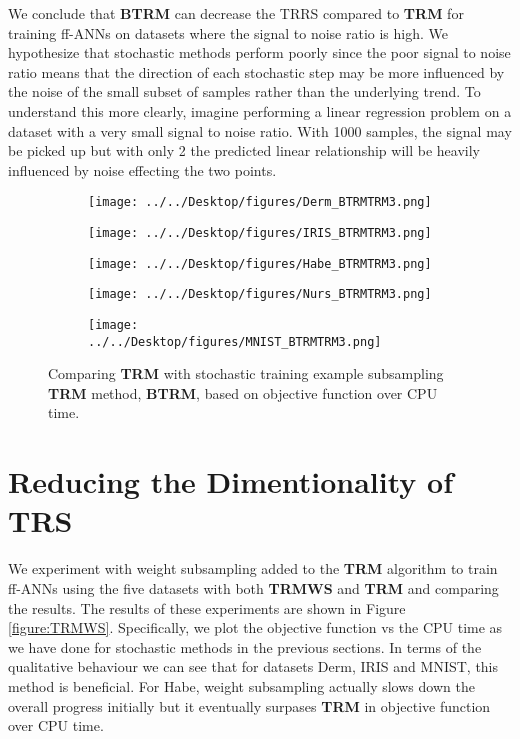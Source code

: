 \documentclass[letterpaper,12pt,titlepage,oneside,final]{book}
\begin{document}
	We conclude that \textbf{BTRM} can decrease the TRRS compared to \textbf{TRM} for training ff-ANNs on datasets where the signal to noise ratio is high. We hypothesize that stochastic methods perform poorly since the poor signal to noise ratio means that the direction of each stochastic step may be more influenced by the noise of the small subset of samples rather than the underlying trend. To understand this more clearly, imagine performing a linear regression problem on a dataset with a very small signal to noise ratio. With 1000 samples, the signal may be picked up but with only 2 the predicted linear relationship will be heavily influenced by noise effecting the two points. 
	
	\begin{figure}
		\centering
		\begin{subfigure}{.45\textwidth}
			\texttt{[image: ../../Desktop/figures/Derm\_BTRMTRM3.png]}
		\end{subfigure}%
		\begin{subfigure}{.45\textwidth}
			\texttt{[image: ../../Desktop/figures/IRIS\_BTRMTRM3.png]}
		\end{subfigure}
		\begin{subfigure}{.45\textwidth}
			\texttt{[image: ../../Desktop/figures/Habe\_BTRMTRM3.png]}
		\end{subfigure}
		\begin{subfigure}{.45\textwidth}
			\texttt{[image: ../../Desktop/figures/Nurs\_BTRMTRM3.png]}
		\end{subfigure}
		\begin{subfigure}{.45\textwidth}
			\texttt{[image: ../../Desktop/figures/MNIST\_BTRMTRM3.png]}
		\end{subfigure}
		\caption{Comparing \textbf{TRM} with stochastic training example subsampling \textbf{TRM} method, \textbf{BTRM}, based on objective function over CPU time.}
		\label{figure:BTRMTRM}
	\end{figure}

	
	\section{Reducing the Dimentionality of TRS}
	
	We experiment with weight subsampling added to the \textbf{TRM} algorithm to train ff-ANNs using the five datasets with both \textbf{TRMWS} and \textbf{TRM} and comparing the results. The results of these experiments are shown in Figure \ref{figure:TRMWS}. Specifically, we plot the objective function vs the CPU time as we have done for stochastic methods in the previous sections. In terms of the qualitative behaviour we can see that for datasets Derm, IRIS and MNIST, this method is beneficial. For Habe, weight subsampling actually slows down the overall progress initially but it eventually surpases \textbf{TRM} in objective function over CPU time. 
	
\end{document}
